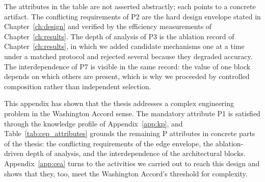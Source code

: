 The attributes in the table are not asserted abstractly; each points
to a concrete artifact. The conflicting requirements of P2 are the
hard design envelope stated in Chapter~\ref{ch:design} and verified by
the efficiency measurements of Chapter~\ref{ch:results}. The depth of
analysis of P3 is the ablation record of Chapter~\ref{ch:results}, in
which we added candidate mechanisms one at a time under a matched
protocol and rejected several because they degraded accuracy. The
interdependence of P7 is visible in the same record: the value of one
block depends on which others are present, which is why we proceeded
by controlled composition rather than independent selection.

This appendix has shown that the thesis addresses a complex
engineering problem in the Washington Accord sense. The mandatory
attribute P1 is satisfied through the knowledge profile of
Appendix~\ref{app:kp}, and Table~\ref{tab:cep_attributes} grounds the
remaining P attributes in concrete parts of the thesis: the
conflicting requirements of the edge envelope, the ablation-driven
depth of analysis, and the interdependence of the architectural
blocks. Appendix~\ref{app:cea} turns to the activities we carried out
to reach this design and shows that they, too, meet the Washington
Accord's threshold for complexity.

